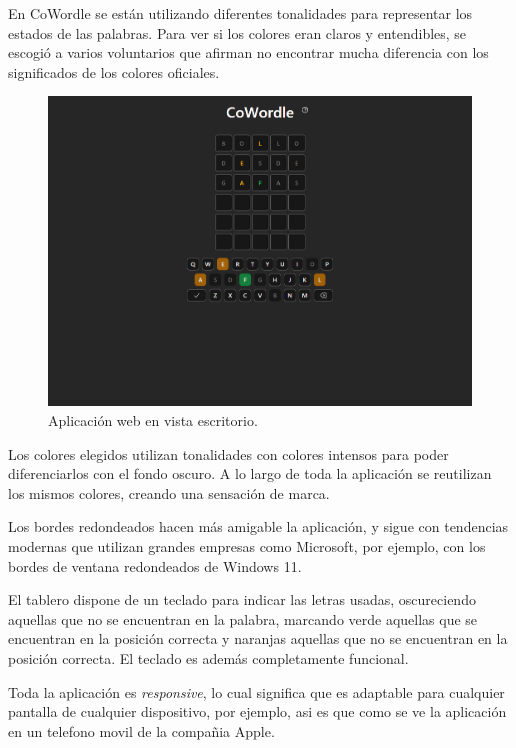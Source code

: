 En CoWordle se están utilizando diferentes tonalidades para representar los estados de las palabras. Para ver si los colores eran claros y entendibles, se escogió a varios voluntarios que afirman no encontrar mucha diferencia con los significados de los colores oficiales.

\begin{figure}[H]
	\centering
	\includegraphics[clip=true,width=\textwidth]{./images/design/cowordle_desktop.png}
	\caption{Aplicación web en vista escritorio.}
	\label{fig:web_desktop}
\end{figure}

Los colores elegidos utilizan tonalidades con colores intensos para poder diferenciarlos con el fondo oscuro. A lo largo de toda la aplicación se reutilizan los mismos colores, creando una sensación de marca.

Los bordes redondeados hacen más amigable la aplicación, y sigue con tendencias modernas que utilizan grandes empresas como Microsoft, por ejemplo, con los bordes de ventana redondeados de Windows 11.

El tablero dispone de un teclado para indicar las letras usadas, oscureciendo aquellas que no se encuentran en la palabra, marcando verde aquellas que se encuentran en la posición correcta y naranjas aquellas que no se encuentran en la posición correcta. El teclado es además completamente funcional.

Toda la aplicación es \textit{responsive}, lo cual significa que es adaptable para cualquier pantalla de cualquier dispositivo, por ejemplo, asi es que como se ve la aplicación en un telefono movil de la compañia Apple. 

